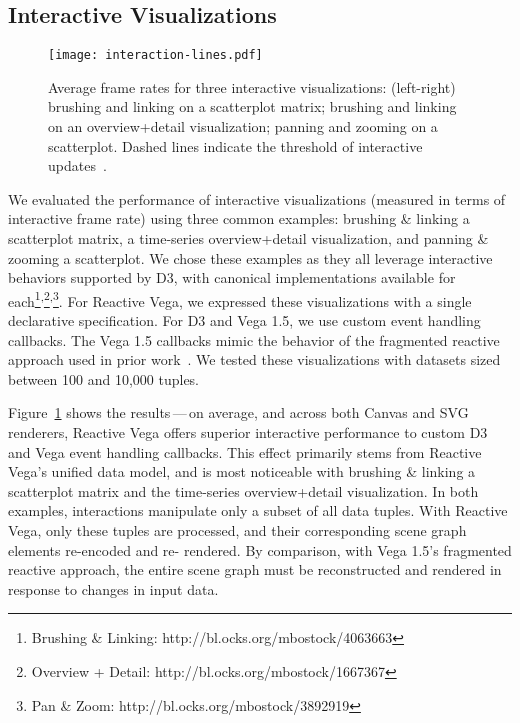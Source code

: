 \subsection{Interactive Visualizations}

\begin{figure}[h!]
  \centering
  \texttt{[image: interaction-lines.pdf]}
  \caption{Average frame rates for three interactive visualizations: (left-right)
  brushing and linking on a scatterplot matrix; brushing and linking on an
  overview+detail visualization; panning and zooming on a scatterplot. Dashed
  lines indicate the threshold of interactive updates~\cite{card:modelhuman}.}
  \label{fig:vg:interactive_benchmark}
\end{figure}

We evaluated the performance of interactive visualizations (measured in terms of
interactive frame rate) using three common examples: brushing \& linking a
scatterplot matrix, a time-series overview+detail visualization, and panning \&
zooming a scatterplot. We chose these examples as they all leverage interactive
behaviors supported by D3, with canonical implementations available for
each\footnote{Brushing \& Linking:
http://bl.ocks.org/mbostock/4063663}\textsuperscript{,}\footnote{Overview +
Detail: http://bl.ocks.org/mbostock/1667367}\textsuperscript{,}\footnote{Pan \&
Zoom: http://bl.ocks.org/mbostock/3892919}. For Reactive Vega, we expressed
these visualizations with a single declarative specification. For D3 and Vega
1.5, we use custom event handling callbacks. The Vega 1.5 callbacks mimic the
behavior of the fragmented reactive approach used in prior
work~\cite{satyanarayan:declarative}. We tested these visualizations with
datasets sized between 100 and 10,000 tuples.

Figure~\ref{fig:vg:interactive_benchmark} shows the results\,---\,on average, and
across both Canvas and SVG renderers, Reactive Vega offers superior interactive
performance to custom D3 and Vega event handling callbacks. This effect
primarily stems from Reactive Vega's unified data model, and is most noticeable
with brushing \& linking a scatterplot matrix and the time-series
overview+detail visualization. In both examples, interactions manipulate only a
subset of all data tuples. With Reactive Vega, only these tuples are processed,
and their corresponding scene graph elements re-encoded and re- rendered. By
comparison, with Vega 1.5's fragmented reactive approach, the entire scene graph
must be reconstructed and rendered in response to changes in input data.